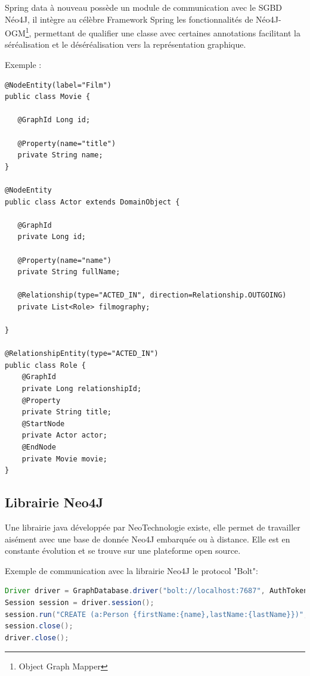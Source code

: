 \documentclass[a4paper,fleqn,12pt]{report}
\begin{document}
Spring data à nouveau possède un module de communication avec le SGBD Néo4J, il intègre au célèbre Framework Spring les fonctionnalités de Néo4J-OGM\footnote{Object Graph Mapper}, permettant de qualifier une classe avec certaines annotations facilitant la séréalisation et le déséréalisation vers la représentation graphique.

Exemple : 

\begin{lstlisting}
@NodeEntity(label="Film")
public class Movie {

   @GraphId Long id;

   @Property(name="title")
   private String name;
}

@NodeEntity
public class Actor extends DomainObject {

   @GraphId
   private Long id;

   @Property(name="name")
   private String fullName;

   @Relationship(type="ACTED_IN", direction=Relationship.OUTGOING)
   private List<Role> filmography;

}

@RelationshipEntity(type="ACTED_IN")
public class Role {
    @GraphId   
    private Long relationshipId;
    @Property  
    private String title;
    @StartNode 
    private Actor actor;
    @EndNode   
    private Movie movie;
}
\end{lstlisting}

\subsection{Librairie Neo4J}

Une librairie java développée par NeoTechnologie existe, elle permet de travailler aisément avec une base de donnée Neo4J embarquée ou à distance. Elle est en constante évolution et se trouve sur une plateforme open source. 

Exemple de communication avec la librairie Neo4J le protocol "Bolt":

\begin{lstlisting}[language=java]
Driver driver = GraphDatabase.driver("bolt://localhost:7687", AuthTokens.basic("matrix", "neo"));
Session session = driver.session();
session.run("CREATE (a:Person {firstName:{name},lastName:{lastName}})", parameters("firstName","Gilles","lastName","Bodart"));
session.close();
driver.close();

\end{lstlisting}
\end{document}
